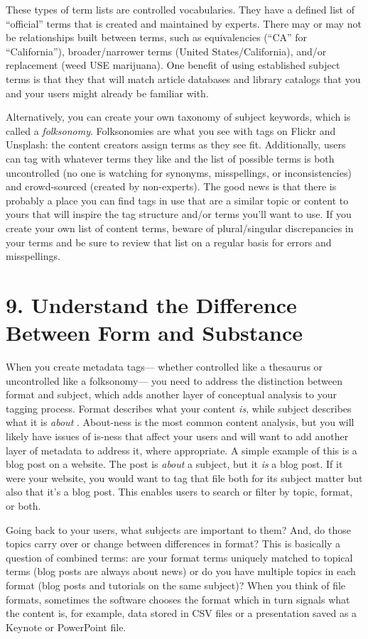 \documentclass[10pt,letterpaper]{article}
\newcommand{\rulemajor}[1]{\section*{#1}}
\begin{document}
These types of term lists are controlled vocabularies. They have a defined list
of ``official'' terms that is created and maintained by experts. There may or
may not be relationships built between terms, such as equivalencies (``CA'' for
``California''), broader/narrower terms (United States/California), and/or
replacement (weed USE marijuana). One benefit of using established subject terms
is that they that will match article databases and library catalogs that you and
your users might already be familiar with.

Alternatively, you can create your own taxonomy of subject keywords, which is
called a \emph{folksonomy}. Folksonomies are what you see with tags on Flickr
and Unsplash: the content creators assign terms as they see fit. Additionally,
users can tag with whatever terms they like and the list of possible terms is
both uncontrolled (no one is watching for synonyms, misspellings, or
inconsistencies) and crowd-sourced (created by non-experts). The good news is
that there is probably a place you can find tags in use that are a similar topic
or content to yours that will inspire the tag structure and/or terms you'll want
to use. If you create your own list of content terms, beware of plural/singular
discrepancies in your terms and be sure to review that list on a regular basis
for errors and misspellings.

\rulemajor{9. Understand the Difference Between Form and Substance}

When you create metadata tags--- whether controlled like a thesaurus or
uncontrolled like a folksonomy--- you need to address the distinction between
format and subject, which adds another layer of conceptual analysis to your
tagging process. Format describes what your content \emph{is}, while subject
describes what it is \emph{about} \cite{Joudrey2015}.  About-ness is the most
common content analysis, but you will likely have issues of is-ness that affect
your users and will want to add another layer of metadata to address it, where
appropriate. A simple example of this is a blog post on a website.  The post is
\emph{about} a subject, but it \emph{is} a blog post.  If it were your website,
you would want to tag that file both for its subject matter but also that it's a
blog post.  This enables users to search or filter by topic, format, or both.

Going back to your users, what subjects are important to them? And, do those
topics carry over or change between differences in format? This is basically a
question of combined terms: are your format terms uniquely matched to topical
terms (blog posts are always about news) or do you have multiple topics in each
format (blog posts and tutorials on the same subject)? When you think of file
formats, sometimes the software chooses the format which in turn signals what
the content is, for example, data stored in CSV files or a presentation saved as
a Keynote or PowerPoint file.
\end{document}
